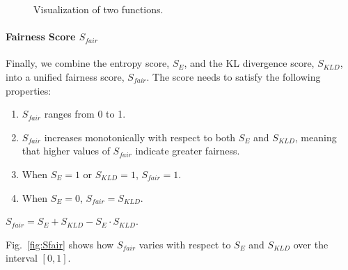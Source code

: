 \begin{figure}[t]
  \centering
  \caption{Visualization of two functions.}
\end{figure}

\paragraph{Fairness Score $S_{fair}$}

Finally, we combine the entropy score, $S_E$, and the KL divergence score, $S_{KLD}$, into a unified fairness score, $S_{fair}$.
The score needs to satisfy the following properties:
\begin{enumerate}[noitemsep, leftmargin=*]
    \item $S_{fair}$ ranges from 0 to 1.
    \item $S_{fair}$ increases monotonically with respect to both $S_E$ and $S_{KLD}$, meaning that higher values of $S_{fair}$ indicate greater fairness.
    \item When $S_E = 1$ or $S_{KLD} = 1$, $S_{fair} = 1$.
    \item When $S_E = 0$, $S_{fair} = S_{KLD}$.
\end{enumerate}
\begin{definition}
$S_{fair} = S_E + S_{KLD} - S_E \cdot S_{KLD}$.
\end{definition}
Fig.~\ref{fig:Sfair} shows how $S_{fair}$ varies with respect to $S_E$ and $S_{KLD}$ over the interval $[0, 1]$.